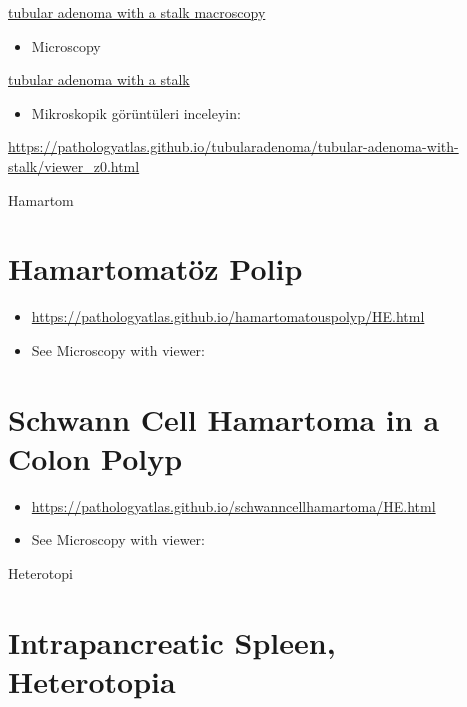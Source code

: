 \documentclass[
  letterpaper,
  DIV=11,
  numbers=noendperiod]{scrreprt}
\providecommand{\tightlist}{%
  \setlength{\itemsep}{0pt}\setlength{\parskip}{0pt}}
\begin{document}
\href{https://pathologyatlas.github.io/tubularadenoma/tubular-adenoma-with-stalk-macroscopy.jpg}{tubular
adenoma with a stalk macroscopy}

\begin{itemize}
\tightlist
\item
  Microscopy
\end{itemize}

\href{https://pathologyatlas.github.io/tubularadenoma/tubular-adenoma-with-stalk.jpeg}{tubular
adenoma with a stalk}

\begin{itemize}
\tightlist
\item
  Mikroskopik görüntüleri inceleyin:
\end{itemize}

\url{https://pathologyatlas.github.io/tubularadenoma/tubular-adenoma-with-stalk/viewer_z0.html}

Hamartom

\hypertarget{hamartomatuxf6z-polip}{%
\chapter{Hamartomatöz Polip}\label{hamartomatuxf6z-polip}}

\begin{itemize}
\item
  \url{https://pathologyatlas.github.io/hamartomatouspolyp/HE.html}
\item
  See Microscopy with viewer:
\end{itemize}

\hypertarget{schwann-cell-hamartoma-in-a-colon-polyp}{%
\chapter{Schwann Cell Hamartoma in a Colon
Polyp}\label{schwann-cell-hamartoma-in-a-colon-polyp}}

\begin{itemize}
\item
  \url{https://pathologyatlas.github.io/schwanncellhamartoma/HE.html}
\item
  See Microscopy with viewer:
\end{itemize}

Heterotopi

\hypertarget{intrapancreatic-spleen-heterotopia}{%
\chapter{Intrapancreatic Spleen,
Heterotopia}\label{intrapancreatic-spleen-heterotopia}}
\end{document}
